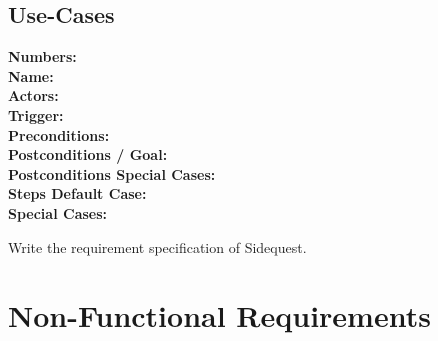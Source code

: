 \documentclass{article}
\begin{document}
\subsection{Use-Cases}

\begin{samepage}
\textbf{Numbers:}\\
\textbf{Name:}\\
\textbf{Actors:}\\
\textbf{Trigger:}\\
\textbf{Preconditions:}\\
\textbf{Postconditions / Goal:}\\
\textbf{Postconditions Special Cases:}\\
\textbf{Steps Default Case:}\\
\textbf{Special Cases:}\\
\end{samepage}

Write the requirement specification of Sidequest.

\section{Non-Functional Requirements}
\end{document}
